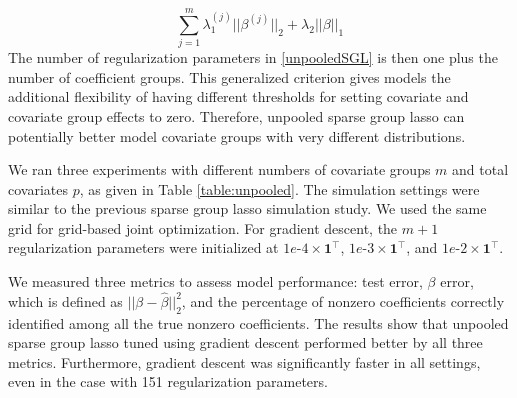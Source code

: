 \documentclass[10pt,letterpaper]{article}
\begin{document}
\begin{equation}
\sum_{j=1}^m \lambda_1^{(j)} \lvert\lvert \beta^{(j)} \rvert \rvert_2
+ \lambda_2 \lvert\lvert \beta \rvert \rvert_1
\label{unpooledSGL}
\end{equation}
The number of regularization parameters in \eqref{unpooledSGL} is then one plus the number of coefficient groups. This generalized criterion gives models the additional flexibility of having different thresholds for setting covariate and covariate group effects to zero. Therefore, unpooled sparse group lasso can potentially better model covariate groups with very different distributions.

We ran three experiments with different numbers of covariate groups $m$ and total covariates $p$, as given in Table \ref{table:unpooled}. The simulation settings were similar to the previous sparse group lasso simulation study. We used the same grid for grid-based joint optimization. For gradient descent, the $m+1$ regularization parameters were initialized at $1e\text{-}4 \times \boldsymbol 1^\top$, $1e\text{-}3 \times \boldsymbol 1^\top$, and $1e\text{-}2 \times \boldsymbol 1^\top$.

We measured three metrics to assess model performance: test error, $\beta$ error, which is defined as $\lvert \lvert \beta - \hat \beta \rvert \rvert_2 ^2$, and the percentage of nonzero coefficients correctly identified among all the true nonzero coefficients. The results show that unpooled sparse group lasso tuned using gradient descent performed better by all three metrics. Furthermore, gradient descent was significantly faster in all settings, even in the case with 151 regularization parameters.
\end{document}
